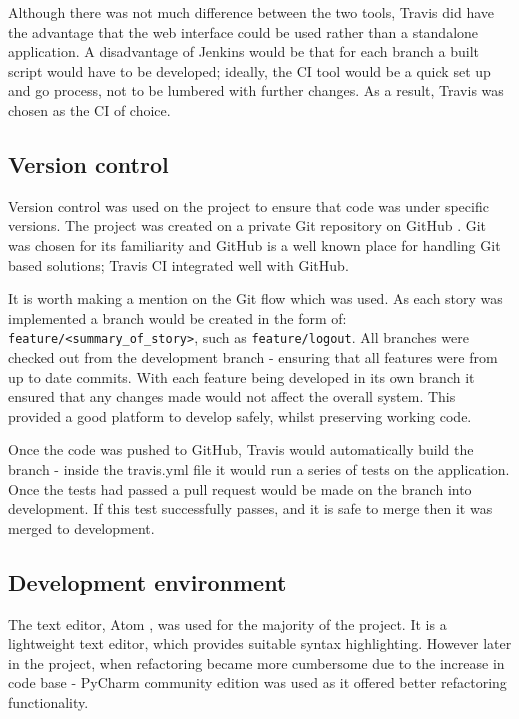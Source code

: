 Although there was not much difference between the two tools, Travis did have the advantage that the web interface could be used rather than a standalone application. A disadvantage of Jenkins would be that for each branch a built script would have to be developed; ideally, the CI tool would be a quick set up and go process, not to be lumbered with further changes. As a result, Travis was chosen as the CI of choice.

\subsection{Version control}
Version control was used on the project to ensure that code was under specific versions. The project was created on a private Git \cite{citeulike:14023846} repository on GitHub \cite{citeulike:13269771}. Git was chosen for its familiarity and GitHub is a well known place for handling Git based solutions; Travis CI integrated well with GitHub.

It is worth making a mention on the Git flow which was used. As each story was implemented a branch would be created in the form of: \texttt{feature/<summary\_of\_story>}, such as \texttt{feature/logout}. All branches were checked out from the development branch - ensuring that all features were from up to date commits. With each feature being developed in its own branch it ensured that any changes made would not affect the overall system. This provided a good platform to develop safely, whilst preserving working code.

Once the code was pushed to GitHub, Travis would automatically build the branch - inside the travis.yml file it would run a series of tests on the application. Once the tests had passed a pull request would be made on the branch into development. If this test successfully passes, and it is safe to merge then it was merged to development.

\subsection{Development environment}
The text editor, Atom \cite{citeulike:14023852}, was used for the majority of the project. It is a lightweight text editor, which provides suitable syntax highlighting. However later in the project, when refactoring became more cumbersome due to the increase in code base - PyCharm community edition \cite{citeulike:14023855} was used as it offered better refactoring functionality.
